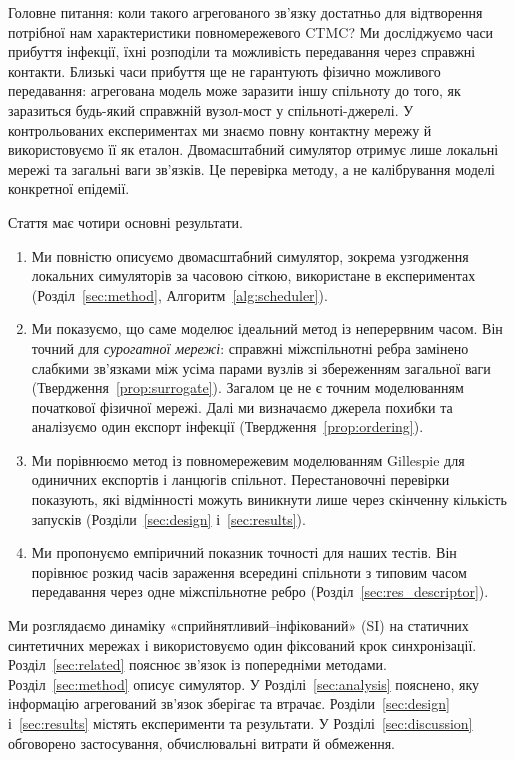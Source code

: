 Головне питання: коли такого агрегованого зв'язку достатньо для відтворення потрібної нам характеристики повномережевого CTMC? Ми досліджуємо часи прибуття інфекції, їхні розподіли та можливість передавання через справжні контакти. Близькі часи прибуття ще не гарантують фізично можливого передавання: агрегована модель може заразити іншу спільноту до того, як заразиться будь-який справжній вузол-мост у спільноті-джерелі. У контрольованих експериментах ми знаємо повну контактну мережу й використовуємо її як еталон. Двомасштабний симулятор отримує лише локальні мережі та загальні ваги зв'язків. Це перевірка методу, а не калібрування моделі конкретної епідемії.

Стаття має чотири основні результати.
\begin{enumerate}
\item Ми повністю описуємо двомасштабний симулятор, зокрема узгодження локальних симуляторів за часовою сіткою, використане в експериментах (Розділ~\ref{sec:method}, Алгоритм~\ref{alg:scheduler}).
\item Ми показуємо, що саме моделює ідеальний метод із неперервним часом. Він точний для \emph{сурогатної мережі}: справжні міжспільнотні ребра замінено слабкими зв'язками між усіма парами вузлів зі збереженням загальної ваги (Твердження~\ref{prop:surrogate}). Загалом це не є точним моделюванням початкової фізичної мережі. Далі ми визначаємо джерела похибки та аналізуємо один експорт інфекції (Твердження~\ref{prop:ordering}).
\item Ми порівнюємо метод із повномережевим моделюванням Gillespie для одиничних експортів і ланцюгів спільнот. Перестановочні перевірки показують, які відмінності можуть виникнути лише через скінченну кількість запусків (Розділи~\ref{sec:design} і~\ref{sec:results}).
\item Ми пропонуємо емпіричний показник точності для наших тестів. Він порівнює розкид часів зараження всередині спільноти з типовим часом передавання через одне міжспільнотне ребро (Розділ~\ref{sec:res_descriptor}).
\end{enumerate}

Ми розглядаємо динаміку «сприйнятливий--інфікований» (SI) на статичних синтетичних мережах і використовуємо один фіксований крок синхронізації. Розділ~\ref{sec:related} пояснює зв'язок із попередніми методами. Розділ~\ref{sec:method} описує симулятор. У Розділі~\ref{sec:analysis} пояснено, яку інформацію агрегований зв'язок зберігає та втрачає. Розділи~\ref{sec:design} і~\ref{sec:results} містять експерименти та результати. У Розділі~\ref{sec:discussion} обговорено застосування, обчислювальні витрати й обмеження.

